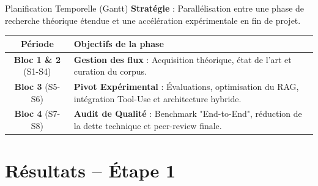 \documentclass[aspectratio=169, 12pt]{beamer}
\begin{document}
\begin{frame}{Planification Temporelle (Gantt)}
    \textbf{Stratégie} : Parallélisation entre une phase de recherche théorique étendue et une accélération expérimentale en fin de projet.
    \vspace{0.3cm}
    \begin{table}[]
        \centering
        \small
        \renewcommand{\arraystretch}{1.5}
        \begin{tabular}{|c|p{8.5cm}|}
            \hline
            \textbf{Période} & \textbf{Objectifs de la phase} \\ \hline
            \textbf{Bloc 1 \& 2} (S1-S4) & \textbf{Gestion des flux} : Acquisition théorique, état de l'art et curation du corpus. \\ \hline
            \textbf{Bloc 3} (S5-S6) & \textbf{Pivot Expérimental} : Évaluations, optimisation du RAG, intégration Tool-Use et architecture hybride. \\ \hline
            \textbf{Bloc 4} (S7-S8) & \textbf{Audit de Qualité} : Benchmark "End-to-End", réduction de la dette technique et peer-review finale. \\ \hline
        \end{tabular}
    \end{table}
\end{frame}
\section{R\'esultats -- \'Etape 1}
\end{document}
